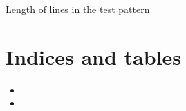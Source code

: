 \documentclass[letterpaper,10pt,english]{sphinxmanual}
\begin{document}
\begin{fulllineitems}
\begin{fulllineitems}
\end{fulllineitems}


\begin{fulllineitems}
\label{\detokenize{index:calibration_pattern.calibration_pattern.width}}
\sphinxAtStartPar
Length of lines in the test pattern

\end{fulllineitems}


\end{fulllineitems}



\chapter{Indices and tables}
\label{\detokenize{index:indices-and-tables}}\begin{itemize}
\item {} 
\sphinxAtStartPar
{}

\item {} 
\sphinxAtStartPar
{}

\end{itemize}


\renewcommand{\indexname}{Python Module Index}
\begin{sphinxtheindex}
\let\bigletter\sphinxstyleindexlettergroup
\bigletter{c}
\item\relax{}
\item\relax{}
\indexspace
\bigletter{g}
\item\relax{}
\end{sphinxtheindex}

\renewcommand{\indexname}{Index}
\printindex
\end{document}
